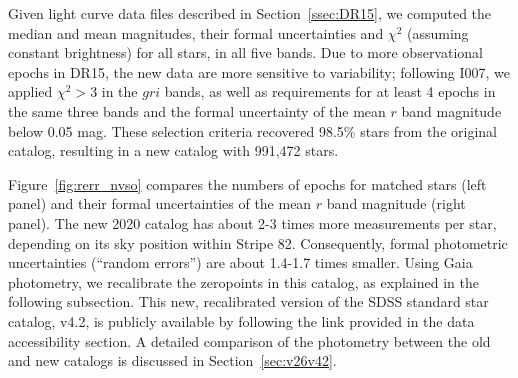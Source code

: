 \documentclass[fleqn,usenatbib]{mnras}
\newcommand{\pO}{\hbox{I007}}
\newcommand{\KT}[1]{\textcolor{magenta}{#1}} %
\begin{document}
Given light curve data files described in Section~\ref{ssec:DR15}, we computed the median 
and mean magnitudes, their formal uncertainties and $\chi^2$ (assuming constant brightness)
for all stars, in all five bands. Due to more observational epochs in DR15, the new data are more 
sensitive to variability; following \pO, we applied $\chi^2>3$ in the $gri$ bands, as well as  
requirements for at least 4 epochs in the same three bands and the formal uncertainty of the 
mean $r$ band magnitude below 0.05 mag. These selection criteria recovered 98.5\% stars from
the original catalog, resulting in a new catalog with 991,472 stars. 

Figure~\ref{fig:rerr_nvso} compares the numbers of epochs for matched stars (left panel) and their formal
uncertainties of the mean $r$ band magnitude (right panel). The new 2020 catalog has about 2-3 times more 
measurements per star, depending on its sky position within Stripe 82. Consequently,  formal 
photometric uncertainties (``random errors'') are about 1.4-1.7 times smaller. Using Gaia photometry, we recalibrate the zeropoints in this catalog, as explained in the following subsection. This new, recalibrated version of the SDSS standard star catalog, v4.2,  is publicly available by following the link provided in the data accessibility section. A detailed comparison of the photometry between the old and new catalogs is discussed in Section~\ref{sec:v26v42}. 
\end{document}
